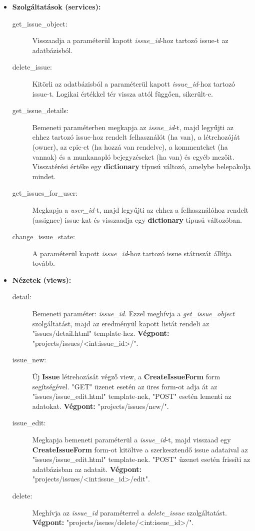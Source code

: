 \begin{itemize}
	\item \textbf{Szolgáltatások (services):}
	\begin{description}
		\item[get\_issue\_object:] Visszaadja a paraméterül kapott \textit{issue\_id}-hoz tartozó issue-t az adatbázisból.
		\item[delete\_issue:] Kitörli az adatbázisból a paraméterül kapott \textit{issue\_id}-hoz tartozó issue-t. Logikai értékkel tér vissza attól függően, sikerült-e.
		\item[get\_issue\_details:] Bemeneti paraméterben megkapja az  \textit{issue\_id}-t, majd legyűjti az ehhez tartozó issue-hoz rendelt felhasználót (ha van), a létrehozóját (owner), az epic-et (ha hozzá van rendelve), a kommenteket (ha vannak) és a munkanapló bejegyzéseket (ha van) és egyéb mezőit. Visszatérési értéke egy \textbf{dictionary} típusú változó, amelybe belepakolja mindet.
		\item[get\_issues\_for\_user:] Megkapja a \textit{user\_id}-t, majd legyűjti az ehhez a felhasználóhoz rendelt (assignee) issue-kat és visszaadja egy \textbf{dictionary} típusú változóban.
		\item[change\_issue\_state:] A paraméterül kapott \textit{issue\_id}-hoz tartozó issue státuszát állítja tovább.
	\end{description}
	\item \textbf{Nézetek (views):}
	\begin{description}
		\item[detail:] Bemeneti paraméter: \textit{issue\_id}. Ezzel meghívja a \textit{get\_issue\_object} szolgáltatást, majd az eredményül kapott listát rendeli az "issues/detail.html" template-hez. \textbf{Végpont:} "projects/issues/<int:issue\_id>/".
		\item[issue\_new:] Új \textbf{Issue} létrehozását végző view, a \textbf{CreateIssueForm} form segítségével. "GET" üzenet esetén az üres form-ot adja át az "issues/issue\_edit.html" template-nek, "POST" esetén lementi az adatokat. \textbf{Végpont:} "projects/issues/new/".
		\item[issue\_edit:] Megkapja bemeneti paraméterül a \textit{issue\_id}-t, majd visszaad egy \textbf{CreateIssueForm} form-ot kitöltve a szerkesztendő issue adataival az "issues/issue\_edit.html" template-nek. "POST" üzenet esetén frissíti az adatbázisban az adatait. \textbf{Végpont:} "projects/issues/<int:issue\_id>/edit".
		\item[delete:] Meghívja az \textit{issue\_id} paraméterrel a \textit{delete\_issue} szolgáltatást. \textbf{Végpont:} "projects/issues/delete/<int:issue\_id>/".

\end{description}
\end{itemize}
